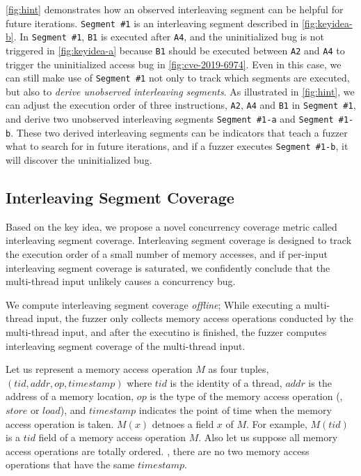 \autoref{fig:hint} demonstrates how an observed interleaving segment
can be helpful for future iterations.
%
\texttt{Segment \#1} is an interleaving segment described in
\autoref{fig:keyidea-b}.
%
In \texttt{Segment \#1}, \texttt{B1} is executed after \texttt{A4},
and the uninitialized bug is not triggered in \autoref{fig:keyidea-a}
because \texttt{B1} should be executed between \texttt{A2} and
\texttt{A4} to trigger the uninitialized access bug in
\autoref{fig:cve-2019-6974}.
%
Even in this case, we can still make use of \texttt{Segment \#1} not
only to track which segments are executed, but also to \textit{derive
  unobserved interleaving segments}.
%
As illustrated in \autoref{fig:hint}, we can adjust the execution
order of three instructions, \texttt{A2}, \texttt{A4} and \texttt{B1}
in \texttt{Segment \#1}, and derive two unobserved interleaving
segments \texttt{Segment \#1-a} and \texttt{Segment \#1-b}.
%
These two derived interleaving segments can be indicators that teach a
fuzzer what to search for in future iterations, and if a fuzzer
executes \texttt{Segment \#1-b}, it will discover the uninitialized
bug.




\subsection{Interleaving Segment Coverage}
\label{ss:coverage}

\newcommand{\mutable}{mutable edge\xspace}
\newcommand{\mutables}{mutable edges\xspace}
\newcommand{\immutable}{immutable edge\xspace}
\newcommand{\immutables}{immutable edges\xspace}


Based on the key idea, we propose a novel concurrency coverage metric
called interleaving segment coverage.
%
Interleaving segment coverage is designed to track the execution order
of a small number of memory accesses, and if per-input interleaving
segment coverage is saturated, we confidently conclude that the
multi-thread input unlikely causes a concurrency bug.


We compute interleaving segment coverage \textit{offline}; While
executing a multi-thread input, the fuzzer only collects memory access
operations conducted by the multi-thread input, and after the
executino is finished, the fuzzer computes interleaving segment
coverage of the multi-thread input.



%
Let us represent a memory access operation $M$ as four tuples,
$(tid, addr, op, timestamp)$ where $tid$ is the identity of a thread,
$addr$ is the address of a memory location, $op$ is the type of the
memory access operation (\ie, $store$ or $load$), and $timestamp$
indicates the point of time when the memory access operation is taken.
%
$M(x)$ detnoes a field $x$ of $M$. For example, $M(tid)$ is a $tid$
field of a memory access operation $M$.
%
Also let us suppose all memory access operations are totally
ordered. \ie, there are no two memory access operations that have the
same $timestamp$.

